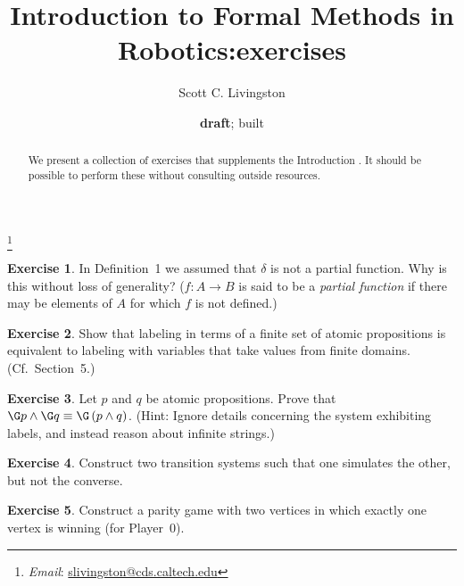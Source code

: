 \documentclass{amsart}
\theoremstyle{definition}
\newtheorem{exer}{Exercise}
\begin{document}
\title{Introduction to Formal Methods in Robotics:\linebreak exercises}
\author{Scott C. Livingston}
\thanks{\textit{Email}: \href{mailto:slivingston@cds.caltech.edu}{slivingston@cds.caltech.edu}}
\date{\textbf{draft}; built \now}
\begin{abstract}
We present a collection of exercises that supplements the Introduction
\cite{ifmr2014}.  It should be possible to perform these without consulting
outside resources.
\end{abstract}
\maketitle


\begin{exer}
In Definition~1 we assumed that $\delta$ is not a partial function.  Why is this
without loss of generality?  ($f:A\rightarrow B$ is said to be a \textit{partial
  function} if there may be elements of $A$ for which $f$ is not defined.)
\end{exer}

\begin{exer}
Show that labeling in terms of a finite set of atomic propositions is equivalent
to labeling with variables that take values from finite domains.
(Cf.\ Section~5.)
\end{exer}

\begin{exer}
Let $p$ and $q$ be atomic propositions.  Prove that $\G p \wedge \G q \equiv  \G \left( p \wedge q \right)$.  (Hint: Ignore details concerning the system exhibiting labels, and instead reason about infinite strings.)
\end{exer}

\begin{exer}
Construct two transition systems such that one simulates the other, but not the converse.
\end{exer}

\begin{exer}
Construct a parity game with two vertices in which exactly one vertex is winning
(for Player~0).
\end{exer}




\end{document}
